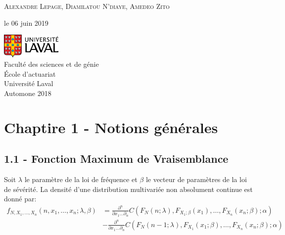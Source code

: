 \documentclass{article}
\begin{document}
\begin{titlepage}
		{\scshape\Large Alexandre Lepage, 
			Diamilatou N'diaye, Amedeo Zito \\} %
		
		\vspace*{3\baselineskip}
		
		le 06 juin 2019
		
		\vspace{0.5\baselineskip} %
		
		\vfill %
		
		
		\includegraphics[height=1.2cm]{UL_P.pdf}\\
		
		Faculté des sciences et de génie\\
		École d'actuariat\\
		Université Laval\\
		Automone 2018       
	\end{titlepage}
	
	\newpage
	\pagestyle{empty}
	
	\tableofcontents
	
	\newpage
	\setcounter{page}{1}
	\pagestyle{plain}
	
	\section{Chaptire 1 - Notions générales}
	\subsection{1.1 - Fonction Maximum de Vraisemblance}

	Soit $\lambda$ le paramètre de la loi de fréquence et $\beta$ le vecteur de paramètres de la loi de sévérité.
	La densité d'une distribution multivariée non absolument continue est donné par:
	\begin{align*}
	f_{N,X_1,\dots,X_n}(n,x_1,\dots,x_n;\lambda,\beta) &= \frac{\partial^n}{\partial x_1 \dots \partial_n} C(F_N(n;\lambda),F_{X_1;\beta}(x_1),\dots,F_{X_n}(x_n;\beta);\alpha)\\
	&   - \frac{\partial^n}{\partial x_1 \dots \partial_n} C(F_N(n-1;\lambda),F_{X_1}(x_1;\beta),\dots,F_{X_n}(x_n;\beta);\alpha)
	\end{align*}
	
\end{document}
